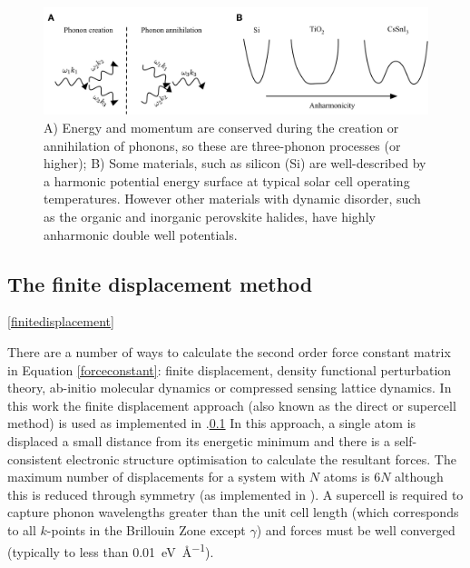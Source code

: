 \begin{figure}[h]
\centering
  \includegraphics[resolution=350]{figures/ch3/anharmonicity.png}
  \caption[3-phonon processes and anharmonic potential energy surfaces]{A) Energy and momentum are conserved during the creation or annihilation of phonons, so these are three-phonon processes (or higher); B) Some materials, such as silicon (Si) are well-described by a harmonic potential energy surface at typical solar cell operating temperatures. However other materials with dynamic disorder, such as the organic and inorganic perovskite halides, have highly anharmonic double well potentials.}
  \label{harmonicregime}
\end{figure}  %



\subsection{The finite displacement method} \ref{finitedisplacement}

There are a number of ways to calculate the second order force constant matrix in Equation \ref{forceconstant}: finite displacement, density functional perturbation theory, ab-initio molecular dynamics or compressed sensing lattice dynamics.
In this work the finite displacement approach (also known as the direct or supercell method) is used as implemented in .\ref{} 
In this approach, a single atom is displaced a small distance from its energetic minimum and there is a self-consistent electronic structure optimisation to calculate the resultant forces. The maximum number of displacements for a system with $N$ atoms is $6N$ although this is reduced through symmetry (as implemented in ). 
A supercell is required to capture phonon wavelengths greater than the unit cell length (which corresponds to all $k$-points in the Brillouin Zone except $\gamma$) and forces must be well converged (typically to less than \SI{0.01}{\electronvolt\per\angstrom}).

